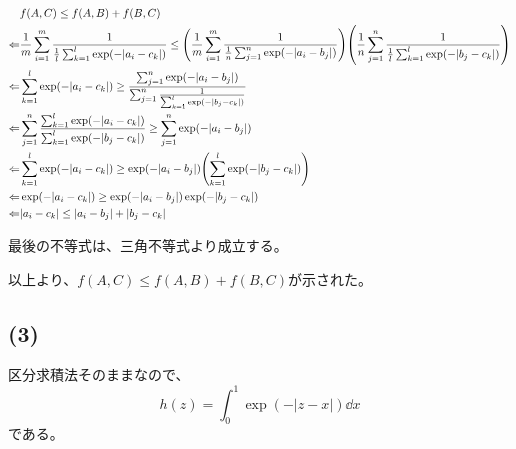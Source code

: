 \documentclass[a4paper, 10pt, dvipdfmx]{jlreq}
\begin{document}
\begin{align*}
             & f(A,C) \leq f(A,B)+f(B,C)                                                                                                                                                                                                                                    \\
  \Leftarrow & \frac{1}{m}\sum_{i=1}^{m}{\frac{1}{\frac{1}{l}\sum_{k=1}^{l}\exp(-|a_i-c_k|)}} \leq \qty(\frac{1}{m}\sum_{i=1}^{m}{\frac{1}{\frac{1}{n}\sum_{j=1}^{n}\exp(-|a_i-b_j|)}})\qty(\frac{1}{n}\sum_{j=1}^{n}{\frac{1}{\frac{1}{l}\sum_{k=1}^{l}\exp(-|b_j-c_k|)}}) \\
  \Leftarrow & \sum_{k=1}^{l}\exp(-|a_i-c_k|) \geq \frac{\sum_{j=1}^{n}\exp(-|a_i-b_j|)}{\sum_{j=1}^{n}{\frac{1}{\sum_{k=1}^{l}\exp(-|b_j-c_k|)}}}                                                                                                                          \\
  \Leftarrow & \sum_{j=1}^{n}{\frac{\sum_{k=1}^{l}\exp(-|a_i-c_k|)}{\sum_{k=1}^{l}\exp(-|b_j-c_k|)}} \geq \sum_{j=1}^{n}\exp(-|a_i-b_j|)                                                                                                                                    \\
  \Leftarrow & \sum_{k=1}^{l}\exp(-|a_i-c_k|) \geq \exp(-|a_i-b_j|)\qty(\sum_{k=1}^{l}\exp(-|b_j-c_k|))                                                                                                                                                                     \\
  \Leftarrow & \exp(-|a_i-c_k|) \geq \exp(-|a_i-b_j|)\exp(-|b_j-c_k|)                                                                                                                                                                                                       \\
  \Leftarrow & |a_i-c_k| \leq |a_i-b_j|+|b_j-c_k|
\end{align*}

最後の不等式は、三角不等式より成立する。

以上より、$f(A,C) \leq f(A,B)+f(B,C)$が示された。

\subsection*{(3)}

区分求積法そのままなので、
\begin{equation*}
  h(z)=\int_0^1{\exp(-|z-x|)}\dd{x}
\end{equation*}
である。
\end{document}
